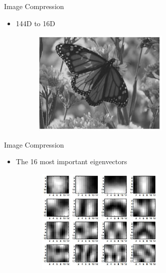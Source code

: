 \documentclass[serif, aspectratio=169]{beamer}
\begin{document}
\begin{frame}{Image Compression}
      \begin{itemize}
          \item 144D to 16D
      \end{itemize}
        \begin{figure}[htpb]
            \begin{center}
                \includegraphics[width=8cm, height=5cm]{pic/16d.JPG}
            \end{center}
        \end{figure}
\end{frame}


\begin{frame}{Image Compression}
      \begin{itemize}
          \item The 16 most important eigenvectors
      \end{itemize}
        \begin{figure}[htpb]
            \begin{center}
                \includegraphics[width=8cm, height=5cm]{pic/16_most.JPG}
            \end{center}
        \end{figure}
\end{frame}
\end{document}
